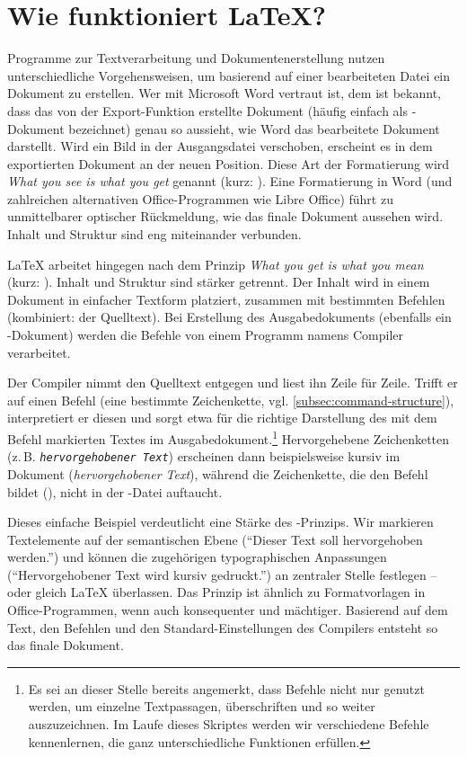 \chapter{Wie funktioniert \LaTeX?}
\label{sec:basic-functionality}

Programme zur Textverarbeitung und Dokumentenerstellung nutzen unterschiedliche Vorgehensweisen, um basierend auf einer bearbeiteten Datei ein Dokument zu erstellen.
Wer mit Microsoft Word vertraut ist, dem ist bekannt, dass das von der Export-Funktion erstellte Dokument (häufig einfach als -Dokument bezeichnet) genau so aussieht, wie Word das bearbeitete Dokument darstellt.
Wird ein Bild in der Ausgangsdatei verschoben, erscheint es in dem exportierten Dokument an der neuen Position.
Diese Art der Formatierung wird \emph{What you see is what you get} genannt (kurz: ).
Eine Formatierung in Word (und zahlreichen alternativen Office-Programmen wie Libre Office) führt zu unmittelbarer optischer Rückmeldung, wie das finale Dokument aussehen wird. 
Inhalt und Struktur sind eng miteinander verbunden.

\LaTeX{} arbeitet hingegen nach dem Prinzip \emph{What you get is what you mean} (kurz: ).
Inhalt und Struktur sind stärker getrennt.
Der Inhalt wird in einem Dokument in einfacher Textform platziert, zusammen mit bestimmten Befehlen (kombiniert: der Quelltext).
Bei Erstellung des Ausgabedokuments (ebenfalls ein -Dokument) werden die Befehle von einem Programm namens Compiler verarbeitet.

Der Compiler nimmt den Quelltext entgegen und liest ihn Zeile für Zeile.
Trifft er auf einen Befehl (eine bestimmte Zeichenkette, vgl. \cref{subsec:command-structure}), interpretiert er diesen und sorgt etwa für die richtige Darstellung des mit dem Befehl markierten Textes im Ausgabedokument.\footnote{Es sei an dieser Stelle bereits angemerkt, dass Befehle nicht nur genutzt werden, um einzelne Textpassagen, überschriften und so weiter auszuzeichnen. Im Laufe dieses Skriptes werden wir verschiedene Befehle kennenlernen, die ganz unterschiedliche Funktionen erfüllen.}
Hervorgehebene Zeichenketten (z.\,B. \texttt{\emph{hervorgehobener Text}}) erscheinen dann beispielsweise kursiv im Dokument (\emph{hervorgehobener Text}), während die Zeichenkette, die den Befehl bildet (\texttt{\emph{}}), nicht in der -Datei auftaucht.

Dieses einfache Beispiel verdeutlicht eine Stärke des -Prinzips. 
Wir markieren Textelemente auf der semantischen Ebene (\enquote{Dieser Text soll hervorgehoben werden.}) und können die zugehörigen typographischen Anpassungen (\enquote{Hervorgehobener Text wird kursiv gedruckt.}) an zentraler Stelle festlegen -- oder gleich \LaTeX{} überlassen.
Das Prinzip ist ähnlich zu Formatvorlagen in Office-Programmen, wenn auch konsequenter und mächtiger.
Basierend auf dem Text, den Befehlen und den Standard-Einstellungen des Compilers entsteht so das finale Dokument.

